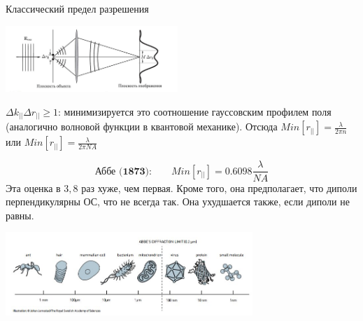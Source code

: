 \documentclass[9pt, compress, xcolor=table]{beamer}
\begin{document}
\begin{frame}{Классический предел разрешения}

\begin{center}
\includegraphics[width=6.5cm]{fig4_03}
\end{center}

{\scriptsize $\Delta k_{||} \Delta r_{||} \geq 1$: минимизируется это соотношение гауссовским
профилем поля (аналогично волновой функции в квантовой механике). Отсюда $ Min [r_{||}] =
\frac{\lambda}{2 \pi n}$ или $Min [r_{||}] = \frac{\lambda}{2 \pi NA}$}

\begin{equation*}
\boxed{
\textbf{Аббе (1873):}\qquad Min [r_{||}] = 0.6098\frac{\lambda}{NA}}
\end{equation*}
{\scriptsize Эта оценка в $3,8$ раз хуже, чем первая. Кроме того, она предполагает, что диполи
перпендикулярны ОС, что не всегда так. Она ухудшается также, если диполи не равны.}

\begin{center}
\includegraphics[width=0.7\textwidth]{ffm0}
\end{center}

\end{frame}
\end{document}

